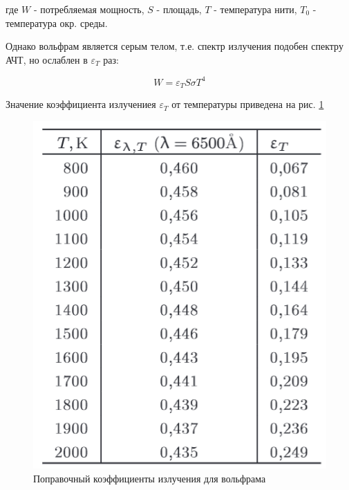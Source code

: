 \documentclass[a4paper]{article}
\begin{document}
где $W$ - потребляемая мощность, $S$ - площадь, $T$ - температура нити,  $T_0$ - температура окр. среды.\par

Однако вольфрам является серым телом, т.е. спектр излучения подобен спектру АЧТ, но ослаблен в $\varepsilon_T$ раз:

\begin{equation}
    W = \varepsilon_T S \sigma T^4
\end{equation}

Значение коэффициента излучениея $\varepsilon_T$ от температуры приведена на рис. \ref{p2}

\begin{figure}[h]
	\begin{center}
	\begin{minipage}[h]{0.4\linewidth}
	\includegraphics[width=1\linewidth]{p2.png}
	\caption{Поправочный коэффициенты излучения для вольфрама} 
	\label{p2}
	\end{minipage}
	\hfill 
	\begin{minipage}[h]{0.45\linewidth}

\end{minipage}
\end{center}
\end{figure}
\end{document}
